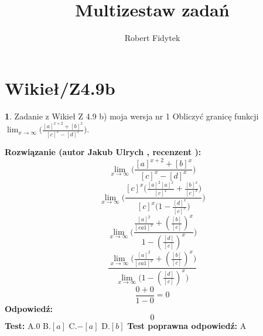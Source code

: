 \documentclass[12pt, a4paper]{article}
\title{Multizestaw zadań}
\author{Robert Fidytek}
\date{}
\theoremstyle{definition} %
\newtheorem{zad}{}
\newcommand{\kategoria}[1]{\section{#1}} %
\newcommand{\zadStart}[1]{\begin{zad}#1\newline} %
\newcommand{\zadStop}{\end{zad}}   %
\newcommand{\rozwStart}[2]{\noindent \textbf{Rozwiązanie (autor #1 , recenzent #2): }\newline} %
\newcommand{\rozwStop}{\newline}                                            %
\newcommand{\odpStart}{\noindent \textbf{Odpowiedź:}\newline}    %
\newcommand{\odpStop}{\newline}                                             %
\newcommand{\testStart}{\noindent \textbf{Test:}\newline} %
\newcommand{\testStop}{\newline} %
\newcommand{\kluczStart}{\noindent \textbf{Test poprawna odpowiedź:}\newline} %
\newcommand{\kluczStop}{\newline} %
\begin{document}
\maketitle


\kategoria{Wikieł/Z4.9b}
\zadStart{Zadanie z Wikieł Z 4.9 b) moja wersja nr 1}
Obliczyć granicę funkcji $\lim_{x \to \infty}\bigg(\frac{[a]^{x+2}+[b]^{x}}{[c]^{x}-[d]^{x}}\bigg)$.
\zadStop
\rozwStart{Jakub Ulrych}{}
$$\lim_{x \to \infty}\bigg(\frac{[a]^{x+2}+[b]^{x}}{[c]^{x}-[d]^{x}}\bigg)$$
$$\lim_{x \to \infty}\bigg(\frac{[c]^{x}\big(\frac{[a]^{2}[a]^{x}}{[c]^{x}}+\frac{[b]^{x}}{[c]^{x}}\big)}{[c]^{x}\big(1-\frac{[d]^{x}}{[c]^{x}}\big)}\bigg)$$
$$\lim_{x \to \infty}\bigg(\frac{\frac{[a]^{2}}{[ca1]^{x}}+(\frac{[b]}{[c]})^{x}}{1-(\frac{[d]}{[c]})^{x}}\bigg)$$
$$\frac{\lim_{x \to \infty}\big(\frac{[a]^{2}}{[ca1]^{x}}+(\frac{[b]}{[c]})^{x}\big)}{\lim_{x \to \infty}\big(1-(\frac{[d]}{[c]})^{x}\big)}$$
$$\frac{0+0}{1-0}=0$$
\rozwStop
\odpStart
$$0$$
\odpStop
\testStart
A.$0$
B.$[a]$
C.$-[a]$
D.$[b]$
\testStop
\kluczStart
A
\kluczStop
\end{document}
